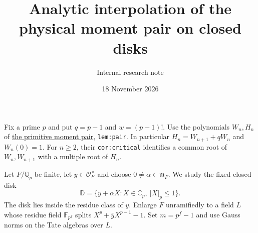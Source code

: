 \documentclass[11pt]{article}
\title{Analytic interpolation of the physical moment pair on closed disks}
\author{Internal research note}\date{18 November 2026}
\begin{document}
\setlength{\emergencystretch}{1em}\maketitle
Fix a prime $p$ and put $q=p-1$ and $w=(p-1)!$.
Use the polynomials $W_n,H_n$ of
\href{PHYSICAL_PRIME_MOMENT_PAIR_RECURRENCES.tex}
{the primitive moment pair}, \texttt{lem:pair}.
In particular $H_n=W_{n+1}+qW_n$ and $W_n(0)=1$.
For $n\ge2$, their \texttt{cor:critical} identifies a common
root of $W_n,W_{n+1}$ with a multiple root of $H_n$.

Let $F/\mathbb Q_p$ be finite, let $y\in\mathcal O_F^\times$ and choose
$0\ne\alpha\in\mathfrak m_F$. We study the fixed closed disk
\[
 \mathbb D=\{y+\alpha X:X\in\mathbb C_p,\ |X|_p\le1\}.
\]
The disk lies inside the residue class of $y$.
Enlarge $F$ unramifiedly to a field $L$ whose residue field
$\mathbb F_{p^f}$ splits
$X^p+\bar y X^{p-1}-1$. Set $m=p^f-1$ and use Gauss norms
on the Tate algebras over $L$.
\end{document}
